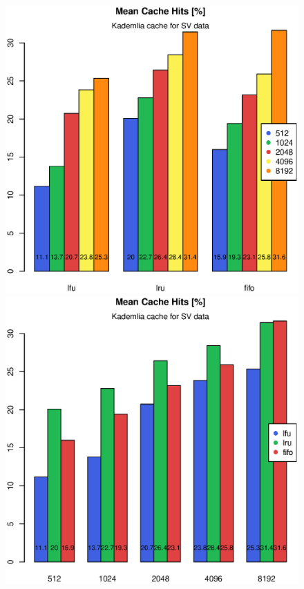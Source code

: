 \documentclass[a4paper,11pt]{scrartcl}
\begin{document}
\begin{figure}[h!]
\begin{minipage}{0.48\linewidth}
\centering
\includegraphics[width=0.9\linewidth]{img/tests/p2p_mean_sv_1.eps}
\end{minipage}
\begin{minipage}{0.48\linewidth}
\centering
\includegraphics[width=0.9\linewidth]{img/tests/p2p_mean_sv_2.eps}
\end{minipage}
\begin{minipage}{0.48\linewidth}

\end{minipage}
\end{figure}
\end{document}
